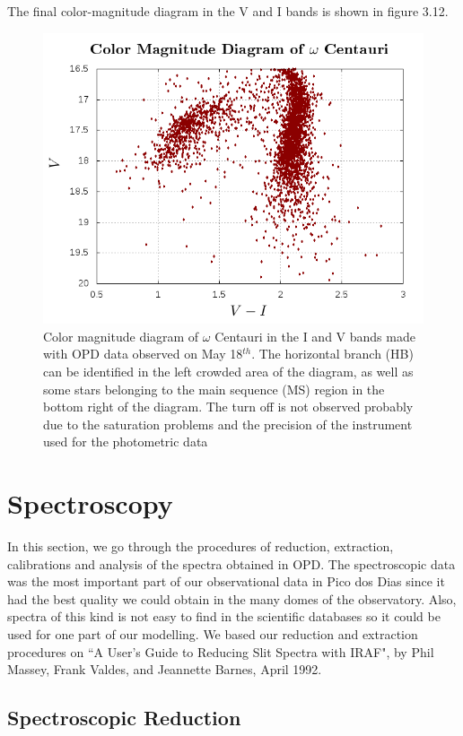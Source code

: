 The final color-magnitude diagram in the V and I bands is shown in figure 3.12.

\begin{figure}[H]
\centering
\includegraphics[width=12cm]{images/HR-diagram.png}
\caption[Color magnitude diagram of Omega Centauri with our photometric data]{Color magnitude diagram of $\omega$ Centauri in the I and V bands made with OPD data observed on May 18$^{th}$. The horizontal branch (HB) can be identified in the left crowded area of the diagram, as well as some stars belonging to the main sequence (MS)  region in the bottom right of the diagram. The turn off is not observed probably due to the saturation problems and the precision of the instrument used for the photometric data}
\end{figure}

\section{Spectroscopy}

In this section, we go through the procedures of reduction, extraction, calibrations and analysis of the spectra obtained in OPD. The spectroscopic data was the most important part of our observational data in Pico dos Dias since it had the best quality we could obtain in the many domes of the observatory. Also, spectra of this kind is not easy to find in the scientific databases so it could be used for one part of our modelling. We based our reduction and extraction procedures on ``A User's Guide to Reducing Slit Spectra with IRAF", by Phil Massey, Frank Valdes, and Jeannette Barnes, April 1992. 

\subsection{Spectroscopic Reduction}


